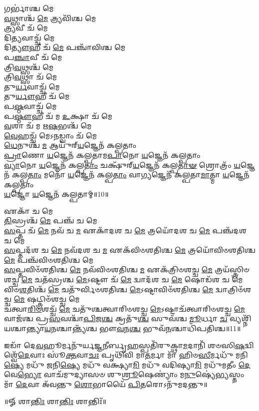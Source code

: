 𑌗𑌰𑍍𑌭𑌾॑𑌶𑍍𑌚 𑌮𑍇\\
\-\ul{𑌵}\-𑌥𑍍𑌸𑌾𑌶𑍍𑌚᳴ \ul{𑌮𑍇} 𑌤𑍍𑌰𑍍𑌯𑌵𑌿᳴𑌶𑍍𑌚 𑌮𑍇\\
\-\ul{𑌤𑍍𑌰𑍍𑌯}\-𑌵𑍀 𑌚᳴ 𑌮𑍇\\
𑌦𑌿\-\ul{𑌤𑍍𑌯}\-𑌵𑌾𑌚𑍍𑌚᳴ 𑌮𑍇\\
𑌦𑌿\-\ul{𑌤𑍍𑌯𑍗}\-𑌹𑍀 𑌚᳴ \ul{𑌮𑍇} 𑌪𑌞𑍍𑌚𑌾᳴𑌵𑌿𑌶𑍍𑌚 𑌮𑍇\\
𑌪\-\ul{𑌞𑍍𑌚𑌾}\-𑌵𑍀 𑌚᳴ 𑌮𑍇\\
𑌤𑍍𑌰𑌿\-\ul{𑌵}\-𑌥𑍍𑌸𑌶𑍍𑌚᳴ 𑌮𑍇\\
𑌤𑍍𑌰𑌿\-\ul{𑌵}\-𑌥𑍍𑌸𑌾 𑌚᳴ 𑌮𑍇\\
𑌤𑍁\-\ul{𑌰𑍍𑌯}\-𑌵𑌾𑌚𑍍𑌚᳴ 𑌮𑍇\\
𑌤𑍁\-\ul{𑌰𑍍𑌯𑍗}\-𑌹𑍀 𑌚᳴ 𑌮𑍇\\
𑌪\-\ul{𑌷𑍍𑌠}\-𑌵𑌾𑌚𑍍𑌚᳴ 𑌮𑍇\\
𑌪\-\ul{𑌷𑍍𑌠𑍗}\-𑌹𑍀 𑌚᳴ 𑌮 \ul{𑌉}\-𑌕𑍍𑌷𑌾 𑌚᳴ 𑌮𑍇\\
\-\ul{𑌵}\-𑌶𑌾 𑌚᳴ 𑌮 𑌋\-\ul{𑌷}\-𑌭𑌶𑍍𑌚᳴ 𑌮𑍇\\
\-\ul{𑌵𑍇}\-𑌹𑌚𑍍𑌚᳴ 𑌮𑍇𑌽\-\ul{𑌨}\-𑌡𑍍𑌵𑌾𑌂 𑌚᳴ 𑌮𑍇\\
\-\ul{𑌧𑍇}\-𑌨𑍁𑌶𑍍𑌚᳴ \ul{𑌮} 𑌆𑌯𑍁᳴𑌰𑍍‌\-\ul{𑌯}\-𑌜𑍍𑌞𑍇𑌨᳴ 𑌕𑌲𑍍𑌪𑌤𑌾𑌂\\
\-\ul{𑌪𑍍𑌰𑌾}\-𑌣𑍋 \ul{𑌯}\-𑌜𑍍𑌞𑍇𑌨᳴ 𑌕𑌲𑍍𑌪𑌤𑌾𑌮\-\ul{𑌪𑌾}\-𑌨𑍋 \ul{𑌯}\-𑌜𑍍𑌞𑍇𑌨᳴ 𑌕𑌲𑍍𑌪𑌤𑌾𑌂\\
\-\ul{𑌵𑍍𑌯𑌾}\-𑌨𑍋 \ul{𑌯}\-𑌜𑍍𑌞𑍇𑌨᳴ 𑌕𑌲𑍍𑌪\-\ul{𑌤𑌾𑌂} 𑌚𑌕𑍍𑌷𑍁᳴𑌰𑍍‌\-\ul{𑌯}\-𑌜𑍍𑌞𑍇𑌨᳴ 𑌕𑌲𑍍𑌪\-\ul{𑌤𑌾}\-\-\ul{𑍟} 𑌶𑍍𑌰𑍋𑌤𑍍𑌰𑌂᳴ \ul{𑌯}\-𑌜𑍍𑌞𑍇𑌨᳴ 𑌕𑌲𑍍𑌪\-\ul{𑌤𑌾𑌂} 𑌮𑌨𑍋᳴ \ul{𑌯}\-𑌜𑍍𑌞𑍇𑌨᳴ 𑌕𑌲𑍍𑌪\-\ul{𑌤𑌾𑌂} 𑌵𑌾\-\ul{𑌗𑍍𑌯}\-𑌜𑍍𑌞𑍇𑌨᳴ 𑌕𑌲𑍍𑌪𑌤𑌾\-\ul{𑌮𑌾}\-𑌤𑍍𑌮𑌾 \ul{𑌯}\-𑌜𑍍𑌞𑍇𑌨᳴ 𑌕𑌲𑍍𑌪𑌤𑌾𑌂\\
\-\ul{𑌯}\-𑌜𑍍𑌞𑍋 \ul{𑌯}\-𑌜𑍍𑌞𑍇𑌨᳴ 𑌕𑌲𑍍𑌪𑌤𑌾𑌮𑍍॥10॥ 

𑌏𑌕𑌾᳴ 𑌚 𑌮𑍇\\
\-\ul{𑌤𑌿}\-𑌸𑍍𑌰𑌶𑍍𑌚᳴ \ul{𑌮𑍇} 𑌪𑌞𑍍𑌚᳴ 𑌚 𑌮𑍇\\
\-\ul{𑌸}\-𑌪𑍍𑌤 𑌚᳴ \ul{𑌮𑍇} 𑌨𑌵᳴ 𑌚 \ul{𑌮} 𑌏𑌕𑌾᳴𑌦𑌶 𑌚 \ul{𑌮𑍇} 𑌤𑍍𑌰𑌯𑍋᳴𑌦𑌶 𑌚 \ul{𑌮𑍇} 𑌪𑌞𑍍𑌚᳴𑌦𑌶 𑌚 𑌮𑍇\\
\-\ul{𑌸}\-𑌪𑍍𑌤𑌦᳴𑌶 𑌚 \ul{𑌮𑍇} 𑌨𑌵᳴𑌦𑌶 𑌚 \ul{𑌮} 𑌏𑌕᳴𑌵𑌿𑍞𑌶𑌤𑌿𑌶𑍍𑌚 \ul{𑌮𑍇} 𑌤𑍍𑌰𑌯𑍋᳴𑌵𑌿𑍞𑌶𑌤𑌿𑌶𑍍𑌚 \ul{𑌮𑍇} 𑌪𑌞𑍍𑌚᳴𑌵𑌿𑍞𑌶𑌤𑌿𑌶𑍍𑌚 𑌮𑍇\\
\-\ul{𑌸}\-𑌪𑍍𑌤𑌵𑌿𑍞᳴𑌶𑌤𑌿𑌶𑍍𑌚 \ul{𑌮𑍇} 𑌨𑌵᳴𑌵𑌿𑍞𑌶𑌤𑌿𑌶𑍍𑌚 \ul{𑌮} 𑌏𑌕᳴𑌤𑍍𑌰𑌿𑍞𑌶𑌚𑍍𑌚 \ul{𑌮𑍇} 𑌤𑍍𑌰𑌯᳴𑌸𑍍𑌤𑍍𑌰𑌿𑍞𑌶𑌚𑍍𑌚 \ul{𑌮𑍇} 𑌚𑌤᳴𑌸𑍍𑌰𑌶𑍍𑌚 \ul{𑌮𑍇}\-𑌽𑌷𑍍𑌟𑍗 𑌚᳴ \ul{𑌮𑍇} 𑌦𑍍𑌵𑌾𑌦᳴𑌶 𑌚 \ul{𑌮𑍇} 𑌷𑍋𑌡᳴𑌶 𑌚 𑌮𑍇\\
𑌵𑌿𑍞\-\ul{𑌶}\-𑌤𑌿𑌶𑍍𑌚᳴ \ul{𑌮𑍇} 𑌚𑌤𑍁᳴𑌰𑍍𑌵𑌿𑍞𑌶𑌤𑌿𑌶𑍍𑌚 \ul{𑌮𑍇}\-𑌽𑌷𑍍𑌟𑌾𑌵𑌿𑍞᳴𑌶𑌤𑌿𑌶𑍍𑌚 \ul{𑌮𑍇} 𑌦𑍍𑌵𑌾𑌤𑍍𑌰𑌿𑍞᳴𑌶𑌚𑍍𑌚 \ul{𑌮𑍇} 𑌷𑌟𑍍𑌤𑍍𑌰𑌿𑍞᳴𑌶𑌚𑍍𑌚 𑌮𑍇\\
𑌚𑌤𑍍𑌵𑌾\-\ul{𑌰𑌿}\-\-\ul{𑍞}\-𑌶𑌚𑍍𑌚᳴ \ul{𑌮𑍇} 𑌚𑌤𑍁᳴𑌶𑍍𑌚𑌤𑍍𑌵𑌾𑌰𑌿𑍞𑌶𑌚𑍍𑌚 \ul{𑌮𑍇}\-𑌽𑌷𑍍𑌟𑌾𑌚᳴𑌤𑍍𑌵𑌾𑌰𑌿𑍞𑌶𑌚𑍍𑌚 \ul{𑌮𑍇} 𑌵𑌾𑌜᳴𑌶𑍍𑌚 𑌪𑍍𑌰\-\ul{𑌸}\-𑌵𑌶𑍍𑌚𑌾᳴\-\ul{𑌪𑌿}\-𑌜\-\ul{𑌶𑍍𑌚} 𑌕𑍍𑌰𑌤𑍁᳴\-\ul{𑌶𑍍𑌚} 𑌸𑍁𑌵᳴𑌶𑍍𑌚 \ul{𑌮𑍂}\-𑌰𑍍𑌧𑌾 \ul{𑌚} 𑌵𑍍𑌯𑌶𑍍𑌨𑌿᳴𑌯𑌶𑍍𑌚𑌾𑌨𑍍𑌤𑍍𑌯𑌾\-\ul{𑌯}\-𑌨𑌶𑍍𑌚𑌾𑌨𑍍𑌤𑍍𑌯᳴𑌶𑍍𑌚 𑌭𑍗\-\ul{𑌵}\-𑌨\-\ul{𑌶𑍍𑌚} 𑌭𑍁𑌵᳴\-\ul{𑌨}\-𑌶𑍍𑌚𑌾𑌧𑌿᳴𑌪𑌤𑌿𑌶𑍍𑌚॥11॥ 

𑌇𑌡𑌾᳴ 𑌦𑍇\-\ul{𑌵}\-𑌹𑍂𑌰𑍍𑌮𑌨𑍁᳴𑌰𑍍𑌯\-\ul{𑌜𑍍𑌞}\-𑌨𑍀𑌰𑍍𑌬𑍃\-\ul{𑌹}\-𑌸𑍍𑌪𑌤𑌿᳴𑌰𑍁𑌕𑍍𑌥𑌾\-\ul{𑌮}\-𑌦𑌾𑌨𑌿᳴ 𑌶𑍞𑌸𑌿\-\ul{𑌷}\-𑌦𑍍𑌵𑌿𑌶𑍍𑌵𑍇᳴\-\ul{𑌦𑍇}\-𑌵𑌾𑌃 𑌸𑍂॑\-\ul{𑌕𑍍𑌤}\-𑌵𑌾\-\ul{𑌚𑌃} 𑌪𑍃𑌥𑌿᳴𑌵𑌿 𑌮𑌾\-\ul{𑌤}\-𑌰𑍍𑌮𑌾 𑌮𑌾᳴ 𑌹𑌿𑍞\-\ul{𑌸𑍀}\-𑌰𑍍𑌮𑌧𑍁᳴ 𑌮𑌨𑌿\-\ul{𑌷𑍍𑌯𑍇} 𑌮𑌧𑍁᳴ 𑌜𑌨𑌿\-\ul{𑌷𑍍𑌯𑍇} 𑌮𑌧𑍁᳴ 𑌵𑌕𑍍𑌷𑍍𑌯𑌾\-\ul{𑌮𑌿} 𑌮𑌧𑍁᳴ 𑌵𑌦𑌿𑌷𑍍𑌯𑌾\-\ul{𑌮𑌿} 𑌮𑌧𑍁᳴𑌮𑌤𑍀𑌂 \ul{𑌦𑍇}\-𑌵𑍇\-\ul{𑌭𑍍𑌯𑍋} 𑌵𑌾𑌚᳴𑌮𑍁𑌦𑍍𑌯𑌾𑌸𑍞 𑌶𑍁\-\ul{𑌶𑍍𑌰𑍂}\-𑌷𑍇𑌣𑍍𑌯𑌾𑌂॑ 𑌮\-\ul{𑌨𑍁}\-𑌷𑍍𑌯𑍇॑\-\ul{𑌭𑍍𑌯}\-𑌸𑍍𑌤𑌂 𑌮𑌾᳴ \ul{𑌦𑍇}\-𑌵𑌾 𑌅᳴𑌵𑌨𑍍𑌤𑍁 \ul{𑌶𑍋}\-𑌭𑌾𑌯𑍈᳴ \ul{𑌪𑌿}\-𑌤𑌰𑍋𑌽𑌨𑍁᳴𑌮𑌦𑌨𑍍𑌤𑍁॥ 

\centerline{॥𑍐 𑌶𑌾\-\ul{𑌨𑍍𑌤𑌿𑌃} 𑌶𑌾\-\ul{𑌨𑍍𑌤𑌿𑌃} 𑌶𑌾𑌨𑍍𑌤𑌿𑌃᳴॥}


